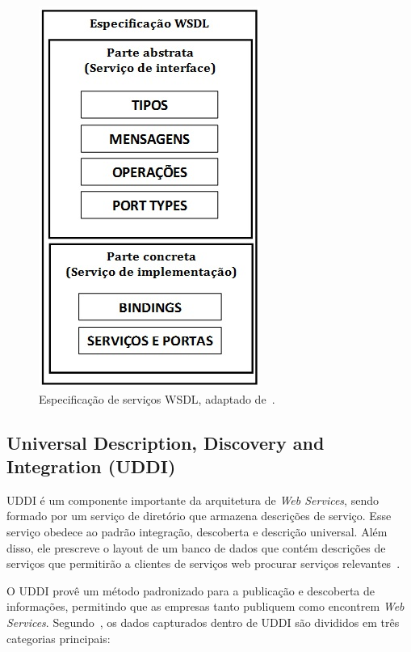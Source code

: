 \begin{figure}[!htb]
\centering
\includegraphics[scale=0.5]{COMPOSICAO_WSDL.jpg}
\caption{Especificação de serviços WSDL, adaptado de~\cite{Bertino2010}.}
\label{fig:composicao_WSDL}
\end{figure}


\subsection{Universal Description, Discovery and Integration (UDDI)}

UDDI é um componente importante da arquitetura de \emph{Web Services}, sendo formado por um serviço de diretório que armazena descrições de serviço. Esse serviço obedece ao padrão integração, descoberta e descrição universal. Além disso,  ele prescreve o layout de um banco de dados que contém  descrições de serviços que permitirão a clientes de serviços web procurar serviços relevantes~\cite{TANENBAUM2007}.

O UDDI provê um método padronizado para a publicação e descoberta de informações, permitindo que as empresas tanto publiquem como encontrem \emph{Web Services}. Segundo~\cite{Cerami2002}, os dados capturados dentro de UDDI são divididos em três categorias principais:

